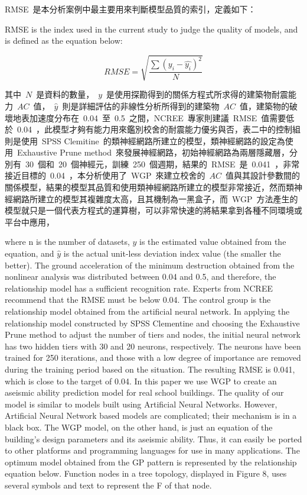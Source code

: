 RMSE~是本分析案例中最主要用來判斷模型品質的索引，定義如下：

RMSE is the index used in the current study to judge the quality of models, and is defined as the equation below:

\begin{equation} RMSE = \sqrt{\dfrac{\sum{(y_i - \hat{y_i})^2}}{N}} \label{eq:RMSE}\end{equation}

其中~$N$~是資料的數量，~$y$~是使用探勘得到的關係方程式所求得的建築物耐震能力~$AC$~值，~$\hat{y}$~則是詳細評估的非線性分析所得到的建築物~$AC$~值，建築物的破壞地表加速度分布在~0.04~至~0.5~之間，NCREE~專家則建議~RMSE~值需要低於~0.04~，此模型才夠有能力用來鑑別校舍的耐震能力優劣與否，表二中的控制組則是使用~SPSS Clemitine~的類神經網路所建立的模型，類神經網路的設定為使用~Exhaustive Prune method~來發展神經網路，初始神經網路為兩層隱藏層，分別有~30~個和~20~個神經元，訓練~250~個週期，結果的~RMSE~是~0.041~，非常接近目標的~0.04~，本分析使用了~WGP~來建立校舍的~$AC$~值與其設計參數間的關係模型，結果的模型其品質和使用類神經網路所建立的模型非常接近，然而類神經網路所建立的模型其複雜度太高，且其機制為一黑盒子，而~WGP~方法產生的模型就只是一個代表方程式的運算樹，可以非常快速的將結果拿到各種不同環境或平台中應用，

where n is the number of datasets, $y$ is the estimated value obtained from the equation, and $\hat{y}$ is the actual unit-less deviation index value (the smaller the better). The ground acceleration of the minimum destruction obtained from the nonlinear analysis was distributed between 0.04 and 0.5, and therefore, the relationship model has a sufficient recognition rate. Experts from NCREE recommend that the RMSE must be below 0.04. The control group is the relationship model obtained from the artificial neural network. In applying the relationship model constructed by SPSS Clementine and choosing the Exhaustive Prune method to adjust the number of tiers and nodes, the initial neural network has two hidden tiers with 30 and 20 neurons, respectively. The neurons have been trained for 250 iterations, and those with a low degree of importance are removed during the training period based on the situation. The resulting RMSE is 0.041, which is close to the target of 0.04. In this paper we use WGP to create an aseismic ability prediction model for real school buildings. The quality of our model is similar to models built using Artificial Neural Networks. However, Artificial Neural Network based models are complicated; their mechanism is in a black box. The WGP model, on the other hand, is just an equation of the building’s design parameters and its aseismic ability. Thus, it can easily be ported to other platforms and programming languages for use in many applications. The optimum model obtained from the GP pattern is represented by the relationship equation below. Function nodes in a tree topology, displayed in Figure 8, uses several symbols and text to represent the F of that node.

